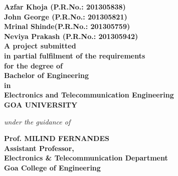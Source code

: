 \begin{center}
\vspace{0.4cm}
\bfseries{Azfar Khoja (P.R.No.: 201305838)\\John George (P.R.No.: 201305821)\\Mrinal Shinde(P.R.No.: 201305759)\\Neviya Prakash (P.R.No.: 201305942)}\\
\vspace{0.4cm}
A project submitted\\in partial fulfilment of the requirements\\for the degree  of\\Bachelor of Engineering\\in\\Electronics and Telecommunication Engineering\\GOA UNIVERSITY\\
\vspace{0.4cm}
\begin{small}
\emph{under the guidance of}\\
\end{small}
\vspace{0.5cm}
{\bfseries \large Prof. MILIND FERNANDES}\\
{\bfseries \large Assistant Professor,\\Electronics \& Telecommunication Department\\Goa College of Engineering}\\
\vspace{1cm}
\end{center}